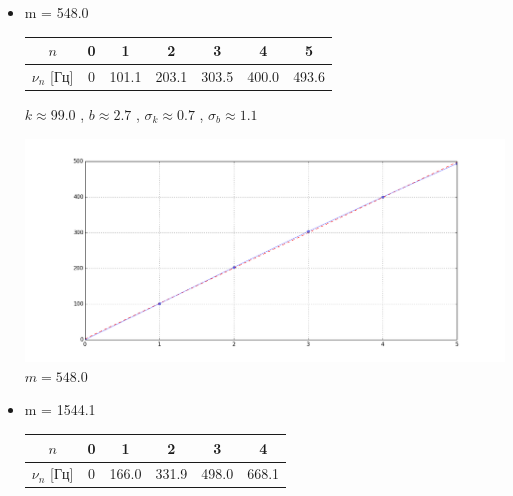 \documentclass[8pt]{article}
\begin{document}
\begin{itemize}
        \item m = 548.0
                    \begin{center}
                    \begin{tabular}{|c|c|c|c|c|c|c|}
                            \hline 
                                $n$ & 0 & 1 & 2 & 3 & 4 & 5 \\
                            \hline
                                $\nu_n$ [Гц] &0&101.1&203.1&303.5&400.0&493.6\\
                            \hline
                    \end{tabular}
                    \end{center}
            $k \approx 99.0$  , $b \approx 2.7$ , $\sigma_k \approx 0.7$ , $\sigma_b \approx 1.1$ \\
            \begin{center} 
                \includegraphics[width=5in]{m1.png} \\ \tiny{$m = 548.0$}
            \end{center}
        \item m = 1544.1
                    \begin{center}
                    \begin{tabular}{|c|c|c|c|c|c|}
                            \hline 
                                $n$ & 0 & 1 & 2 & 3 & 4  \\
                            \hline
                                $\nu_n$ [Гц] &0&166.0&331.9&498.0&668.1\\
                            \hline
                    \end{tabular}
                    \end{center}

\end{itemize}
\end{document}
